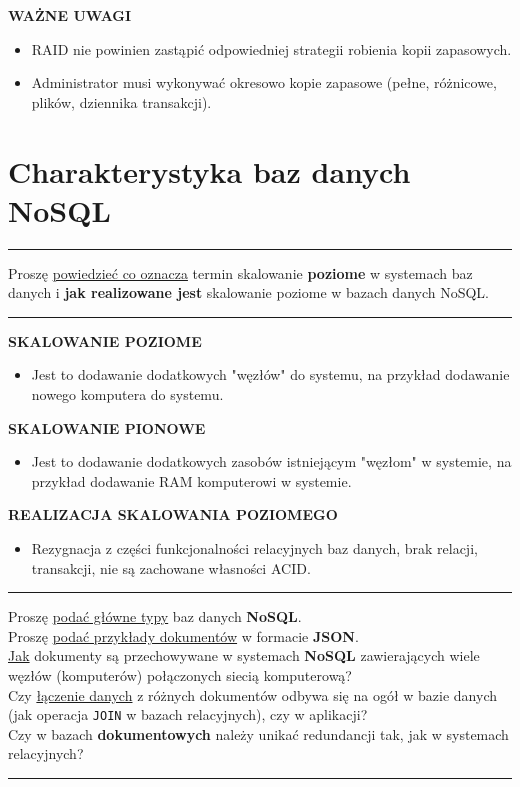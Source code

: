\documentclass[a5paper,6pt]{article}
\newcommand{\horrule}[1]{\rule{\linewidth}{#1}}
\begin{document}
    \textbf{WAŻNE UWAGI}
    \begin{itemize}
        \item RAID nie powinien zastąpić odpowiedniej strategii robienia kopii
              zapasowych.
        \item Administrator musi wykonywać okresowo kopie zapasowe (pełne,
              różnicowe, plików, dziennika transakcji).
    \end{itemize}


\pagebreak

    \section{Charakterystyka baz danych NoSQL} %
    \label{sec:charakterystyka_baz_danych_nosql}

    \horrule{0.5pt}
    Proszę \underline{powiedzieć co oznacza} termin skalowanie \textbf{poziome}
    w systemach baz danych i \textbf{jak realizowane jest} skalowanie poziome
    w bazach danych NoSQL.\\
    \horrule{0.5pt}

    \vskip 0.5cm

    \textbf{SKALOWANIE POZIOME}
    \begin{itemize}
        \item Jest to dodawanie dodatkowych "węzłów" do systemu, na przykład
              dodawanie nowego komputera do systemu.
    \end{itemize}

    \textbf{SKALOWANIE PIONOWE}
    \begin{itemize}
        \item Jest to dodawanie dodatkowych zasobów istniejącym "węzłom" w
        systemie, na przykład dodawanie RAM komputerowi w systemie.
    \end{itemize}

    \textbf{REALIZACJA SKALOWANIA POZIOMEGO}
    \begin{itemize}
        \item Rezygnacja z części funkcjonalności relacyjnych baz danych,
              brak relacji, transakcji, nie są zachowane własności ACID.
    \end{itemize}

    \horrule{0.5pt}
    Proszę \underline{podać główne typy} baz danych \textbf{NoSQL}.\\
    Proszę \underline{podać przykłady dokumentów} w formacie \textbf{JSON}.\\
    \underline{Jak} dokumenty są przechowywane w systemach \textbf{NoSQL}
    zawierających wiele węzłów (komputerów) połączonych siecią komputerową?\\
    Czy \underline{łączenie danych} z różnych dokumentów odbywa się na ogół w
    bazie danych
    (jak operacja \texttt{JOIN} w bazach relacyjnych), czy w aplikacji?\\
    Czy w bazach \textbf{dokumentowych} należy unikać redundancji tak, jak w
    systemach relacyjnych?\\
    \horrule{0.5pt}
\end{document}
